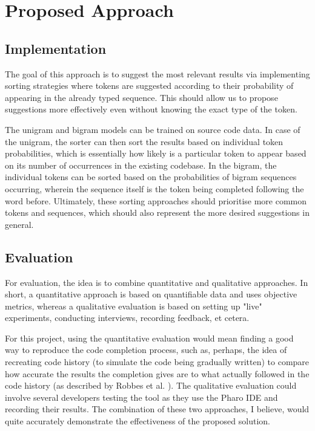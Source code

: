 \documentclass[sigconf,screen]{acmart}
\begin{document}
\section{Proposed Approach}
\subsection{Implementation}
The goal of this approach is to suggest the most relevant results via implementing sorting strategies where tokens are suggested according to their probability of appearing in the already typed sequence. This should allow us to propose suggestions more effectively even without knowing the exact type of the token.

The unigram and bigram models can be trained on source code data. In case of the unigram, the sorter can then sort the results based on individual token probabilities, which is essentially how likely is a particular token to appear based on its number of occurrences in the existing codebase. In the bigram, the individual tokens can be sorted based on the probabilities of bigram sequences occurring, wherein the sequence itself is the token being completed following the word before. Ultimately, these sorting approaches should prioritise more common tokens and sequences, which should also represent the more desired suggestions in general.

\balance

\subsection{Evaluation}
For evaluation, the idea is to combine quantitative and qualitative approaches. In short, a quantitative approach is based on quantifiable data and uses objective metrics, whereas a qualitative evaluation is based on setting up "live" experiments, conducting interviews, recording feedback, et cetera.

For this project, using the quantitative evaluation would mean finding a good way to reproduce the code completion process, such as, perhaps, the idea of recreating code history (to simulate the code being gradually written) to compare how accurate the results the completion gives are to what actually followed in the code history (as described by Robbes et al. \cite{Robb08a}). The qualitative evaluation could involve several developers testing the tool as they use the Pharo IDE and recording their results. The combination of these two approaches, I believe, would quite accurately demonstrate the effectiveness of the proposed solution.
\end{document}
